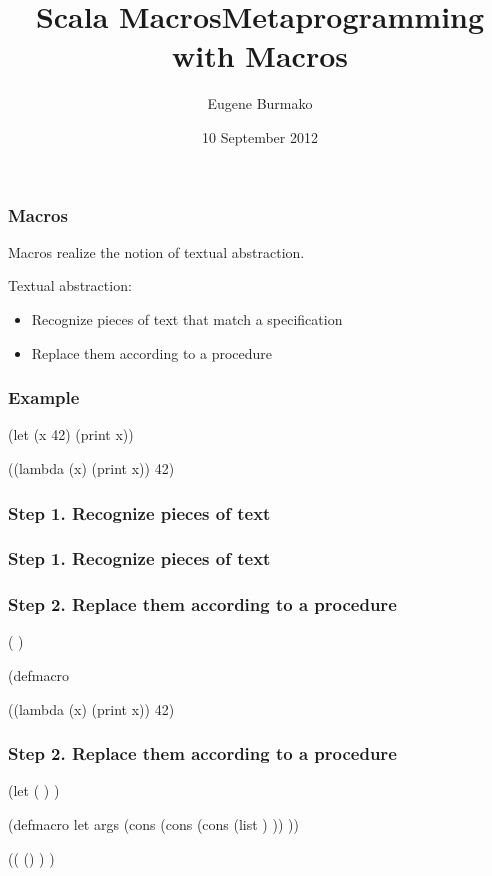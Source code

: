 \documentclass[hyperref={bookmarks=false}]{beamer}
\title{Scala Macros}
\begin{document}
\title{Metaprogramming with Macros}
\author{Eugene Burmako}
\date{10 September 2012}
{
\begin{frame}
  \titlepage
\end{frame}
}

\begin{frame}[fragile]
\frametitle{Macros}
\pause
Macros realize the notion of textual abstraction.

\pause
Textual abstraction:
\begin{itemize}
\item Recognize pieces of text that match a specification
\item Replace them according to a procedure
\end{itemize}
\end{frame}

\begin{frame}[fragile]
\frametitle{Example}
\begin{semiverbatim}
(let (x 42) (print x))







\pause
((lambda (x) (print x)) 42)
\end{semiverbatim}
\end{frame}

\begin{frame}[fragile]
\frametitle<1>{Step 1. Recognize pieces of text}
\frametitle<2>{Step 1. Recognize pieces of text}
\frametitle<3>{Step 2. Replace them according to a procedure}
\begin{semiverbatim}
( )

(defmacro  

((lambda (x) (print x)) 42)
\end{semiverbatim}
\end{frame}

\begin{frame}[fragile]
\frametitle{Step 2. Replace them according to a procedure}
\begin{semiverbatim}
(let (\text{\color{red}{x}} \text{\color{teal}{42}}) \text{\color{violet}{(print x)}})

(defmacro let args
  (cons
   (cons \text{\color{blue}{'lambda}}
         (cons (list \text{\color{red}{(caar args)}})
               \text{\color{violet}{(cdr args)}}))
   \text{\color{teal}{(cdar args)}}))

((\text{\color{blue}{lambda}} (\text{\color{red}{x}}) \text{\color{violet}{(print x)}}) \text{\color{teal}{42}})
\end{semiverbatim}
\end{frame}
\end{document}
